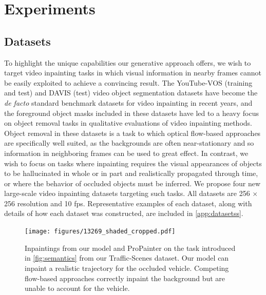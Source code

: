 \chapter{Experiments}
\section{Datasets}
To highlight the unique capabilities our generative approach offers, we wish to target video inpainting tasks in which visual information in nearby frames cannot be easily exploited to achieve a convincing result. The YouTube-VOS \citep{youtubevos1} (training and test) and DAVIS \citep{davis} (test) video object segmentation datasets have become the \emph{de facto} standard benchmark datasets for video inpainting in recent years, and the foreground object masks included in these datasets have led to a heavy focus on object removal tasks in qualitative evaluations of video inpainting methods. Object removal in these datasets is a task to which \eg optical flow-based approaches are specifically well suited, as the backgrounds are often near-stationary and so information in neighboring frames can be used to great effect. In contrast, we wish to focus on tasks where inpainting requires the visual appearances of objects to be hallucinated in whole or in part and realistically propagated through time, or where the behavior of occluded objects must be inferred. We propose four new large-scale video inpainting datasets targeting such tasks. All datasets are 256 $\times$ 256 resolution and 10 fps. Representative examples of each dataset, along with details of how each dataset was constructed, are included in \cref{app:datasetss}.
\begin{figure}[t]
\centering
\texttt{[image: figures/13269\_shaded\_cropped.pdf]}
\caption{Inpaintings from our model and ProPainter on the task introduced in \cref{fig:semantics} from our Traffic-Scenes dataset. Our model can inpaint a realistic trajectory for the occluded vehicle. Competing flow-based approaches correctly inpaint the background but are unable to account for the vehicle.}
\label{fig:traffic-scenes}
\end{figure}
